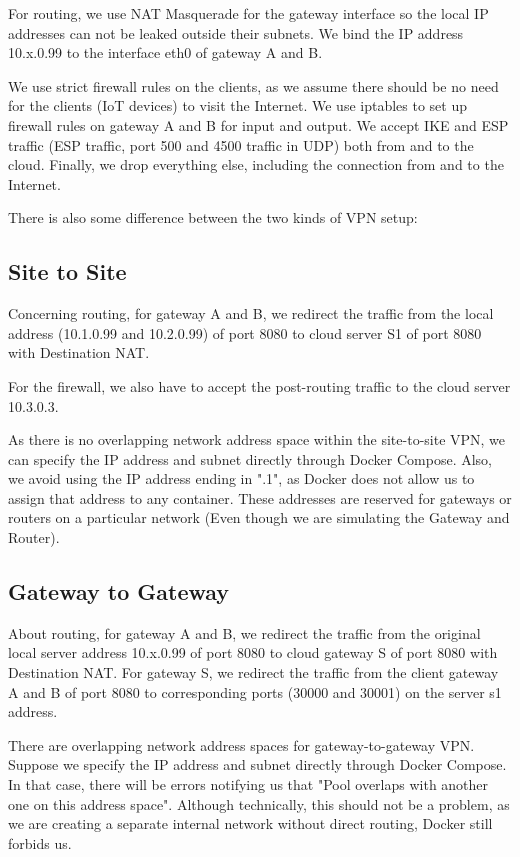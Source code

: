 \documentclass[article]{aaltoseries}
\begin{document}
For routing, we use NAT Masquerade for the gateway interface so the local IP addresses can not be leaked outside their subnets. We bind the IP address 10.x.0.99 to the interface eth0 of gateway A and B.

We use strict firewall rules on the clients, as we assume there should be no need for the clients (IoT devices) to visit the Internet. We use iptables to set up firewall rules on gateway A and B for input and output. We accept IKE and ESP traffic (ESP traffic, port 500 and 4500 traffic in UDP) both from and to the cloud. Finally, we drop everything else, including the connection from and to the Internet.

There is also some difference between the two kinds of VPN setup:

\subsection{Site to Site}

Concerning routing, for gateway A and B, we redirect the traffic from the local address (10.1.0.99 and 10.2.0.99) of port 8080 to cloud server S1 of port 8080 with Destination NAT.

For the firewall, we also have to accept the post-routing traffic to the cloud server 10.3.0.3.

As there is no overlapping network address space within the site-to-site VPN, we can specify the IP address and subnet directly through Docker Compose. Also, we avoid using the IP address ending in ".1", as Docker does not allow us to assign that address to any container. These addresses are reserved for gateways or routers on a particular network (Even though we are simulating the Gateway and Router).

\subsection{Gateway to Gateway}

About routing, for gateway A and B, we redirect the traffic from the original local server address 10.x.0.99 of port 8080 to cloud gateway S of port 8080 with Destination NAT. For gateway S, we redirect the traffic from the client gateway A and B of port 8080 to corresponding ports (30000 and 30001) on the server s1 address.

There are overlapping network address spaces for gateway-to-gateway VPN. Suppose we specify the IP address and subnet directly through Docker Compose. In that case, there will be errors notifying us that "Pool overlaps with another one on this address space". Although technically, this should not be a problem, as we are creating a separate internal network without direct routing, Docker still forbids us.
\end{document}
